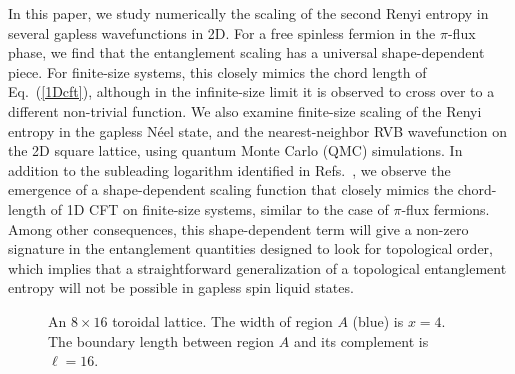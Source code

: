 \documentclass[prl,aps,twocolumn,floatfix,amsmath,amssymb,superscriptaddress,tightenlines]{revtex4}
\begin{document}
In this paper, we study numerically the scaling of the second Renyi entropy in several gapless wavefunctions in 2D.
For a free spinless fermion in the $\pi$-flux phase, we find that the entanglement scaling has a universal shape-dependent piece.
For finite-size systems, this closely mimics the chord length of Eq.~(\ref{1Dcft}), although in the infinite-size limit 
it is observed to cross over to a different non-trivial function.
We also examine finite-size scaling of the Renyi entropy in the gapless N\'eel state, and the nearest-neighbor RVB wavefunction
on the 2D square lattice, using quantum Monte Carlo (QMC) simulations.
In addition to the subleading logarithm identified in Refs.~\cite{HeisLog,MaxLog},
we observe the emergence of a shape-dependent scaling function that closely mimics the chord-length of 1D CFT on finite-size systems, similar to the case of $\pi$-flux fermions.
Among other consequences, this shape-dependent term will give a non-zero signature in the entanglement quantities \cite{KP,LW} designed to look for topological order, which implies that a straightforward generalization of a topological entanglement entropy will not be possible in gapless spin liquid states.



 \begin{figure}
   \begin{center}
   \end{center}
   \caption{An $8 \times 16$ toroidal lattice.  The width of region $A$ (blue) is $x=4$.  The boundary length between region $A$ and its complement is $\ell = 16$. }
   \label{fig:torus}
 \end{figure}
 
\end{document}
